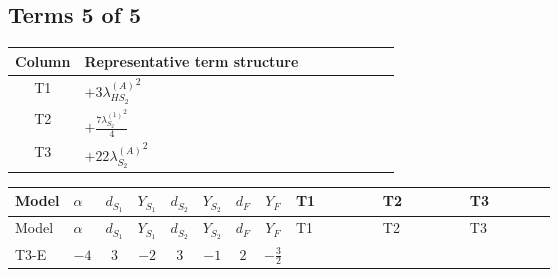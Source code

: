 \documentclass[8pt]{article}
\begin{document}
\begin{landscape}
\subsection*{Terms 5 of 5}
\begin{center}
\begin{tabular}{@{}c >{\raggedright\arraybackslash}p{0.82\linewidth}@{}}
\toprule
Column & Representative term structure \\
\midrule
T1 & \(\displaystyle +3 {\lambda_{HS_2}^{(A)}}^2\) \\
\midrule
T2 & \(\displaystyle +\frac{7 {\lambda_{S_2}^{(1)}}^2}{4}\) \\
\midrule
T3 & \(\displaystyle +22 {\lambda_{S_2}^{(A)}}^2\) \\
\midrule
\bottomrule
\end{tabular}
\end{center}
\smallskip
\tiny
\begin{longtable}{@{}llcccccc >{\raggedright\arraybackslash}p{0.21\linewidth} >{\raggedright\arraybackslash}p{0.21\linewidth} >{\raggedright\arraybackslash}p{0.21\linewidth}@{}}
\toprule
Model & $\alpha$ & $d_{S_1}$ & $Y_{S_1}$ & $d_{S_2}$ & $Y_{S_2}$ & $d_F$ & $Y_F$ & T1 & T2 & T3 \\
\midrule
\endfirsthead
\toprule
Model & $\alpha$ & $d_{S_1}$ & $Y_{S_1}$ & $d_{S_2}$ & $Y_{S_2}$ & $d_F$ & $Y_F$ & T1 & T2 & T3 \\
\midrule
\endhead
T3-E & $-4$ & $3$ & $-2$ & $3$ & $-1$ & $2$ & $-\frac{3}{2}$ & \scriptsize\adjustbox{max width=\linewidth}{$\begin{gathered} +3 {\lambda_{HS_2}^{(A)}}^2\end{gathered}$} & \scriptsize\adjustbox{max width=\linewidth}{$\begin{gathered} +\frac{7 {\lambda_{S_2}^{(1)}}^2}{4}\end{gathered}$} & \scriptsize\adjustbox{max width=\linewidth}{$\begin{gathered} +22 {\lambda_{S_2}^{(A)}}^2\end{gathered}$} \\
\midrule
\bottomrule
\end{longtable}
\end{landscape}
\end{document}
